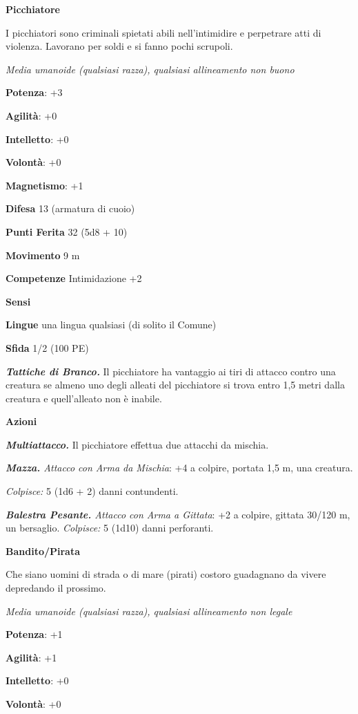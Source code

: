 \begin{multicols}{2}
\textbf{Picchiatore}

I picchiatori sono criminali spietati abili nell'intimidire e perpetrare
atti di violenza. Lavorano per soldi e si fanno pochi scrupoli.

\emph{Media umanoide (qualsiasi razza), qualsiasi allineamento non
buono}

\textbf{Potenza}: +3

\textbf{Agilità}: +0

\textbf{Intelletto}: +0

\textbf{Volontà}: +0

\textbf{Magnetismo}: +1

\textbf{Difesa} 13 (armatura di cuoio)

\textbf{Punti Ferita} 32 (5d8 + 10)

\textbf{Movimento} 9 m

\textbf{Competenze} Intimidazione +2

\textbf{Sensi} 

\textbf{Lingue} una lingua qualsiasi (di solito il Comune)

\textbf{Sfida} 1/2 (100 PE)

\emph{\textbf{Tattiche di Branco.}} Il picchiatore ha vantaggio ai tiri
di attacco contro una creatura se almeno uno degli alleati del
picchiatore si trova entro 1,5 metri dalla creatura e quell'alleato non
è inabile.

\textbf{Azioni}

\emph{\textbf{Multiattacco.}} Il picchiatore effettua due attacchi da
mischia.

\emph{\textbf{Mazza.} Attacco con Arma da Mischia}: +4 a colpire,
portata 1,5 m, una creatura.

\emph{Colpisce:} 5 (1d6 + 2) danni contundenti.

\emph{\textbf{Balestra Pesante.} Attacco con Arma a Gittata}: +2 a
colpire, gittata 30/120 m, un bersaglio. \emph{Colpisce:} 5 (1d10) danni
perforanti.

\textbf{Bandito/Pirata}

Che siano uomini di strada o di mare (pirati) costoro guadagnano da
vivere depredando il prossimo.

\emph{Media umanoide (qualsiasi razza), qualsiasi allineamento non
legale}

\textbf{Potenza}: +1

\textbf{Agilità}: +1

\textbf{Intelletto}: +0

\textbf{Volontà}: +0


\end{multicols}
